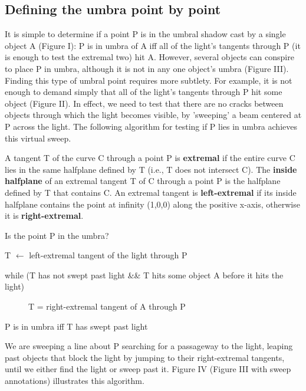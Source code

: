 \documentclass[9pt,twocolumn]{article}
\begin{document}
\subsection{Defining the umbra point by point}
\label{sec:local}

It is simple to determine if a point P is in the umbral shadow cast by a 
single object A (Figure I):
P is in umbra of A iff all of the light's tangents through P (it is enough to test
the extremal two) hit A.
However, several objects can conspire to place P in umbra, although it is not
in any one object's umbra (Figure III).
Finding this type of umbral point requires more subtlety.
For example, it is not enough to demand simply that all of the light's tangents through P
hit some object (Figure II).
In effect, we need to test that there are no cracks between objects through which
the light becomes visible, by 'sweeping' a beam centered at P across the light.
The following algorithm for testing if P lies in umbra achieves this virtual sweep.

\begin{defn2}
A tangent T of the curve C through a point P is {\bf extremal}
if the entire curve C lies in the same halfplane defined by T
(i.e., T does not intersect C).
The {\bf inside halfplane} of an extremal tangent T of C through a point P is
the halfplane defined by T that contains C.
An extremal tangent is {\bf left-extremal} if its inside halfplane 
contains the point at infinity (1,0,0) along the positive x-axis,
otherwise it is {\bf right-extremal}.
\end{defn2}

Is the point P in the umbra?
\begin{description}
\item[] T $\leftarrow$ left-extremal tangent of the light through P
\item[] while (T has not swept past light \&\& 
       T hits some object A before it hits the light)
\begin{description}
\item[]	T = right-extremal tangent of A through P
\end{description}
\item P is in umbra iff T has swept past light
\end{description}

We are sweeping a line about P searching for a passageway to the light, 
leaping past objects that block the light by jumping to their right-extremal tangents, 
until we either find the light or sweep past it.
Figure IV (Figure III with sweep annotations) illustrates this algorithm.
\end{document}
